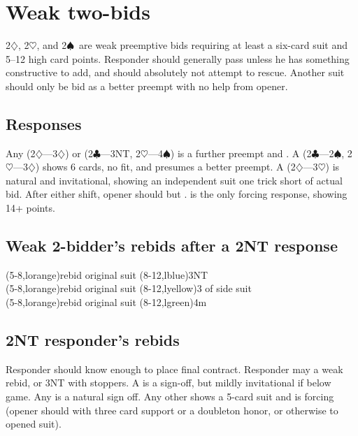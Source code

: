 \documentclass[oneside]{memoir}
\def\C{$\clubsuit$}
\def\D{$\diamondsuit$}
\def\H{$\heartsuit$}
\def\S{$\spadesuit$}
\begin{document}
\section{Weak two-bids}

2\D, 2\H, and 2\S\ are weak preemptive bids requiring at least a six-card
suit and 5--12 high card points.  Responder should generally pass unless
he has something constructive to add, and should absolutely not attempt
to rescue.  Another suit should only be bid as a better
preempt with no help from opener.

\subsection{Responses}
Any  (2\D---3\D) or
 (2\C---3NT, 2\H---4\S) is a further preempt
and .  A 
(2\C---2\S, 2\H---3\D) shows 6 cards, no fit, and presumes a better
preempt.  A  (2\D---3\H) is natural and
invitational, showing an independent suit one trick short of actual
bid.  After either shift, opener should  but
.   is the only forcing
response, showing 14+ points.

\subsection{Weak 2-bidder's rebids after a 2NT response}
\begin{ptable}
    \bid*(5-8,lorange){rebid original suit}
    \bid(8-12,lblue){3NT}\\
    \bid(5-8,lorange){rebid original suit}
    \bid(8-12,lyellow){3 of side suit}\\
    \bid*(5-8,lorange){rebid original suit}
    \bid(8-12,lgreen){4m}\\
\end{ptable}

\subsection{2NT responder's rebids}
Responder should know enough to place final contract.  Responder may
 a weak rebid, or 3NT with stoppers.  A
 is a sign-off, but mildly
invitational if below game.  Any  is a
natural sign off.  Any other  shows
a 5-card suit and is forcing (opener should  with three
card support or a doubleton honor, or otherwise  to
opened suit).
\end{document}
